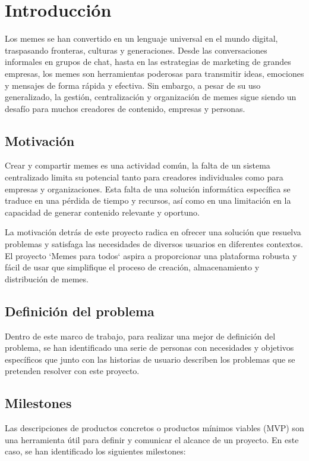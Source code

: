 \chapter{Introducción}

Los memes se han convertido en un lenguaje universal en el mundo digital, traspasando fronteras, culturas y generaciones. Desde las conversaciones informales en grupos de chat, hasta en las estrategias de marketing de grandes empresas, los memes son herramientas poderosas para transmitir ideas, emociones y mensajes de forma rápida y efectiva. Sin embargo, a pesar de su uso generalizado, la gestión, centralización y organización de memes sigue siendo un desafío para muchos creadores de contenido, empresas y personas.

\section{Motivación}

Crear y compartir memes es una actividad común, la falta de un sistema centralizado limita su potencial tanto para creadores individuales como para empresas y organizaciones. Esta falta de una solución informática específica se traduce en una pérdida de tiempo y recursos, así como en una limitación en la capacidad de generar contenido relevante y oportuno.

La motivación detrás de este proyecto radica en ofrecer una solución que resuelva problemas y satisfaga las necesidades de diversos usuarios en diferentes contextos. El proyecto `Memes para todos` aspira a proporcionar una plataforma robusta y fácil de usar que simplifique el proceso de creación, almacenamiento y distribución de memes.

\section{Definición del problema}

Dentro de este marco de trabajo, para realizar una mejor de definición del problema, se han identificado una serie de personas con necesidades y objetivos específicos que junto con las historias de usuario describen los problemas que se pretenden resolver con este proyecto.

\section{Milestones}

Las descripciones de productos concretos o productos mínimos viables (MVP) son una herramienta útil para definir y comunicar el alcance de un proyecto. En este caso, se han identificado los siguientes milestones:

